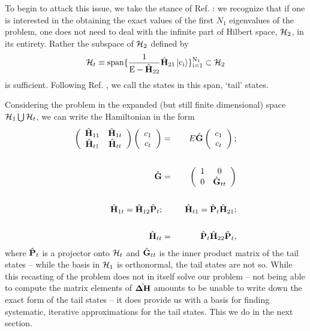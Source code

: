 \documentclass[twocolumn,secnumarabic,amssymb, nobibnotes, aps, prd]{revtex4-2}
\newcommand{\Hll}{\hat{\bf H}_{11}}
\newcommand{\Hhh}{\hat{\bf H}_{22}}
\newcommand{\Hhl}{\hat{\bf H}_{21}}
\newcommand{\Hlh}{\hat{\bf H}_{12}}
\begin{document}
To begin to attack this issue, we take the stance of Ref. \cite{Elias-Miro:2017tup}: we recognize that if one is interested in the obtaining the exact values of the first $N_1$ eigenvalues of the problem, one does not need to deal with the infinite part of Hilbert space, ${\cal H}_2$, in its entirety.  Rather the subspace of ${\cal H}_2$ defined by 
\begin{equation}
    {\cal H}_t \equiv \rm span\{\frac{1}{E-\Hhh}\Hhl\ket{c_i}\}^{N_1}_{i=1} \subset {\cal H}_2
\end{equation}
is sufficient.  Following Ref. \cite{Elias-Miro:2017tup}, we call the states in this span, `tail' states.

\newcommand{\Pt}{\hat {\bf P}_t}
Considering the problem in the expanded (but still finite dimensional) space ${\cal H}_1 \bigcup {\cal H}_t$, we can write the Hamiltonian in the form
\begin{eqnarray}
    \left(
    \begin{array}{cc}
        \Hll & \hat {\bf H}_{1t} \\
        \hat {\bf H}_{t1} & \hat {\bf H}_{tt}
    \end{array}
    \right)
    \left(
    \begin{array}{c}
    c_1 \\
    c_t
    \end{array}
    \right) &=& E
    \hat{\mathbf{G}}
    \left(
    \begin{array}{c}
    c_1 \\
    c_t
    \end{array}
    \right)\label{HmatLO};\cr\cr
    \hat{\mathbf{G}}&=&\left(
    \begin{array}{cc}
        1 & 0  \\
        0 & \hat {\bf G}_{tt}
    \end{array}
    \right)
  \cr\cr
    \hat {\bf H}_{1t} = \Hlh \Pt; &&~~ \hat {\bf H}_{t1} = \Pt\Hhl;\cr\cr
    \hat {\bf H}_{tt} &=& \Pt\Hhh \Pt,
\end{eqnarray}
where $\Pt$ is a projector onto ${\cal H}_t$ and $\hat {\bf G}_{tt}$ is the inner product matrix of the tail states -- while the basis in ${\cal H}_1$ is orthonormal, the tail states are not so.  While this recasting of the problem does not in itself solve our problem -- not being able to compute the matrix elements of $\hat {\bf \Delta H}$ amounts to be unable to write down the exact form of the tail states --  it does provide us with a basis for finding systematic, iterative approximations for the tail states.  This we do in the next section.  
\end{document}
